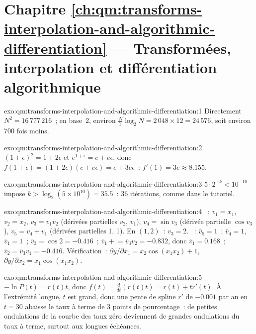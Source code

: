 \section*{Chapitre \ref{ch:qm:transforms-interpolation-and-algorithmic-differentiation} --- Transformées, interpolation et différentiation algorithmique}

\begin{solution}{exo:qm:transforms-interpolation-and-algorithmic-differentiation:1}
Directement $N^2 = 16\,777\,216$~; en base~2, environ $\frac N2\log_2N = 2\,048 \times 12 = 24\,576$, soit environ 700 fois moins.
\end{solution}

\begin{solution}{exo:qm:transforms-interpolation-and-algorithmic-differentiation:2}
$(1 + \epsilon)^2 = 1 + 2\epsilon$ et $e^{1+\epsilon} = e + e\epsilon$, donc $f(1 + \epsilon) = (1 + 2\epsilon)(e + e\epsilon) = e + 3e\epsilon$~: $f'(1) = 3e \approx 8.155$.
\end{solution}

\begin{solution}{exo:qm:transforms-interpolation-and-algorithmic-differentiation:3}
$5 \cdot 2^{-k} < 10^{-10}$ impose $k > \log_2(5 \times 10^{10}) = 35.5$~: 36 itérations, comme dans le tutoriel.
\end{solution}

\begin{solution}{exo:qm:transforms-interpolation-and-algorithmic-differentiation:4}
~: $v_1 = x_1$, $v_2 = x_2$, $v_3 = v_1v_2$ (dérivées partielles $v_2$, $v_1$), $v_4 = \sin v_3$ (dérivée partielle $\cos v_3$), $v_5 = v_4 + v_1$ (dérivées partielles 1, 1). En $(1, 2)$~: $v_3 = 2$. ~: $\bar v_5 = 1$~; $\bar v_4 = 1$,
$\bar v_1 = 1$~; $\bar v_3 = \cos2 = -0.416$~; $\bar v_1 \mathrel{+}= \bar v_3v_2 = -0.832$, donc $\bar v_1 = 0.168$~; $\bar v_2 = \bar v_3v_1 = -0.416$. Vérification~: $\partial y/\partial x_1 = x_2\cos(x_1x_2) + 1$, $\partial y/\partial x_2 = x_1\cos(x_1x_2)$.
\end{solution}

\begin{solution}{exo:qm:transforms-interpolation-and-algorithmic-differentiation:5}
$-\ln P(t) = r(t)t$, donc $f(t) = \frac{d}{dt}(r(t)t) = r(t) + tr'(t)$. À l'extrémité longue, $t$ est grand, donc une pente de spline $r'$ de $-0.001$ par an en $t = 30$ abaisse le taux à terme de 3 points de pourcentage~: de petites ondulations de la
courbe des taux zéro deviennent de grandes ondulations du taux à terme, surtout aux longues échéances.
\end{solution}

